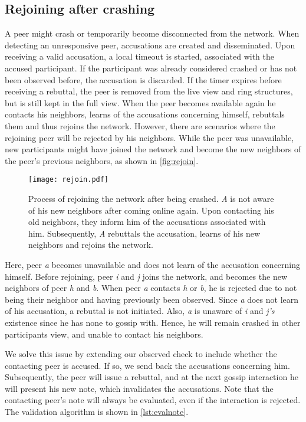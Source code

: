 \documentclass[USenglish]{uit-thesis}
\begin{document}
\subsection{Rejoining after crashing}
A peer might crash or temporarily become disconnected from the network. 
When detecting an unresponsive peer, accusations are created and disseminated.
Upon receiving a valid accusation, a local timeout is started, associated with the accused participant.
If the participant was already considered crashed or has not been observed before, the accusation is discarded.
If the timer expires before receiving a rebuttal, the peer is removed from the live view and ring structures, but is still kept in the full view.
When the peer becomes available again he contacts his neighbors, learns of the accusations concerning himself, rebuttals them and thus rejoins the network.
However, there are scenarios where the rejoining peer will be rejected by his neighbors.
While the peer was unavailable, new participants might have joined the network and become the new neighbors of the peer's previous neighbors, as shown in \autoref{fig:rejoin}.
\begin{figure}[H]
	\centering
	\texttt{[image: rejoin.pdf]}
	\caption[Process of rejoining a Ifrit network.]{Process of rejoining the network after being crashed. \textit{A} is not aware of his new neighbors after coming online again. Upon contacting his old neighbors, they inform him of the accusations associated with him. Subsequently, \textit{A} rebuttals the accusation, learns of his new neighbors and rejoins the network.}
	\label{fig:rejoin}
\end{figure} 

Here, peer \textit{a} becomes unavailable and does not learn of the accusation concerning himself.
Before rejoining, peer \textit{i} and \textit{j} joins the network, and becomes the new neighbors of peer \textit{h} and \textit{b}.
When peer \textit{a} contacts \textit{h} or \textit{b}, he is rejected due to not being their neighbor and having previously been observed.
Since \textit{a} does not learn of his accusation, a rebuttal is not initiated.
Also, \textit{a} is unaware of \textit{i} and \textit{j's} existence since he has none to gossip with.
Hence, he will remain crashed in other participants view, and unable to contact his neighbors.

We solve this issue by extending our observed check to include whether the contacting peer is accused. If so, we send back the accusations concerning him.
Subsequently, the peer will issue a rebuttal, and at the next gossip interaction he will present his new note, which invalidates the accusations.
Note that the contacting peer's note will always be evaluated, even if the interaction is rejected. 
The validation algorithm is shown in \autoref{lst:evalnote}.
\end{document}
